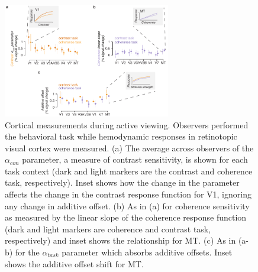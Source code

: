 \begin{figure}
\centering
\includegraphics[keepaspectratio,width=0.65\textwidth]{figs_c3/Fig3_active.pdf}
\caption[Cortical measurements during active viewing]{Cortical measurements during active viewing. Observers performed the behavioral task while hemodynamic responses in retinotopic visual cortex were measured. (a) The average across observers of the $\alpha_{con}$ parameter, a measure of contrast sensitivity, is shown for each task context (dark and light markers are the contrast and coherence task, respectively). Inset shows how the change in the parameter affects the change in the contrast response function for V1, ignoring any change in additive offset. (b) As in (a) for coherence sensitivity as measured by the linear slope of the coherence response function (dark and light markers are coherence and contrast task, respectively) and inset shows the relationship for MT. (c) As in (a-b) for the $\alpha_{task}$ parameter which absorbs additive offsets. Inset shows the additive offset shift for MT.}
\label{fig:c3f3}
\end{figure}

